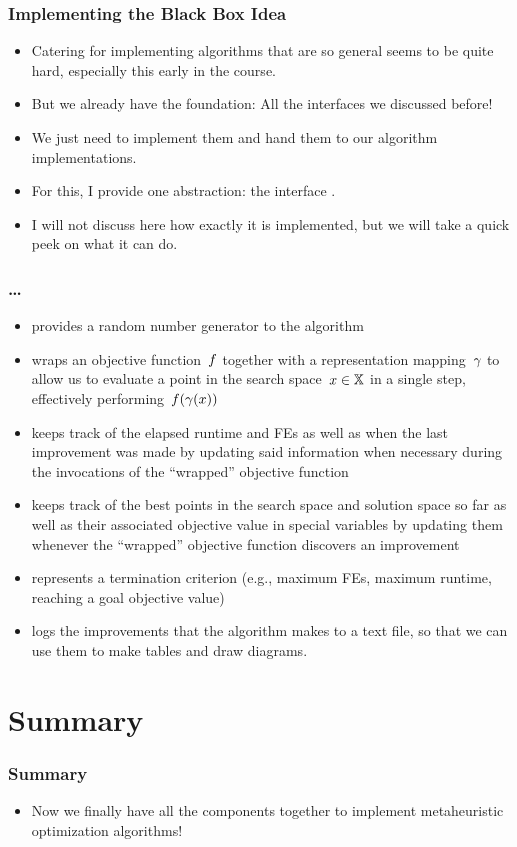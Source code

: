 \documentclass[mathserif]{beamer}%
\begin{document}
%
\begin{frame}%
\frametitle{Implementing the Black Box Idea}%
\begin{itemize}%
\item Catering for implementing algorithms that are so general seems to be quite hard, especially this early in the course.%
\item<2-> But we already have the foundation: All the interfaces we discussed before!%
\item<3-> We just need to implement them and hand them to our algorithm implementations.%
\item<4-> For this, I provide one abstraction: the interface .%
\item<5-> I will not discuss here how exactly it is implemented, but we will take a quick peek on what it can do.%
\end{itemize}%
\end{frame}%
%
\begin{frame}%
\frametitle{\dots}%
\begin{itemize}%
\item provides a random number generator to the algorithm%
\item<2-> wraps an objective function~$f$ together with a representation mapping~$\gamma$ to allow us to evaluate a point in the search space~$x\in\mathbb{X}$ in a single step, effectively performing~$f(\gamma(x))$%
\item<3-> keeps track of the elapsed runtime and FEs as well as when the last improvement was made by updating said information when necessary during the invocations of the ``wrapped'' objective function%
\item<4-> keeps track of the best points in the search space and solution space so far as well as their associated objective value in special variables by updating them whenever the ``wrapped'' objective function discovers an improvement%
\item<5-> represents a termination criterion (e.g., maximum FEs, maximum runtime, reaching a goal objective value)%
\item<6-> logs the improvements that the algorithm makes to a text file, so that we can use them to make tables and draw diagrams.%
\end{itemize}%
\end{frame}%
%
%
\begin{frame}%
\frametitle{}%
\end{frame}%
%
\section{Summary}%
\begin{frame}%
\frametitle{Summary}%
\begin{itemize}%
\item Now we finally have all the components together to implement metaheuristic optimization algorithms!%
\end{itemize}%
\end{frame}%
%
\endPresentation%
\end{document}

